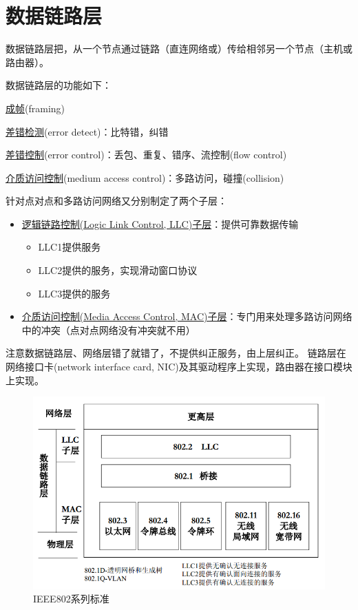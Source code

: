 
\section{数据链路层}
数据链路层把，从一个节点通过链路（直连网络或）传给相邻另一个节点（主机或路由器）。

\bigskip
数据链路层的功能如下：
\begin{partlist}
	\item \underline{成帧}(framing)
	\item \underline{差错检测}(error detect)：比特错，纠错
	\item \underline{差错控制}(error control)：丢包、重复、错序、流控制(flow control)
	\item \underline{介质访问控制}(medium access control)：多路访问，碰撞(collision)
\end{partlist}

\bigskip
针对点对点和多路访问网络又分别制定了两个子层：
\begin{itemize}
	\item \underline{逻辑链路控制(Logic Link Control, LLC)子层}：提供可靠数据传输
	\begin{itemize}
		\item LLC1提供服务
		\item LLC2提供的服务，实现滑动窗口协议
		\item LLC3提供的服务
	\end{itemize}
	\item \underline{介质访问控制(Media Access Control, MAC)子层}：专门用来处理多路访问网络中的冲突（点对点网络没有冲突就不用）
\end{itemize}

注意数据链路层、网络层错了就错了，不提供纠正服务，由上层纠正。
链路层在网络接口卡(network interface card, NIC)及其驱动程序上实现，路由器在接口模块上实现。

\begin{figure}[H]
	\centering
	\includegraphics[width=0.65\linewidth]{fig/ieee802.PNG}
	\caption*{IEEE802系列标准}
\end{figure}

